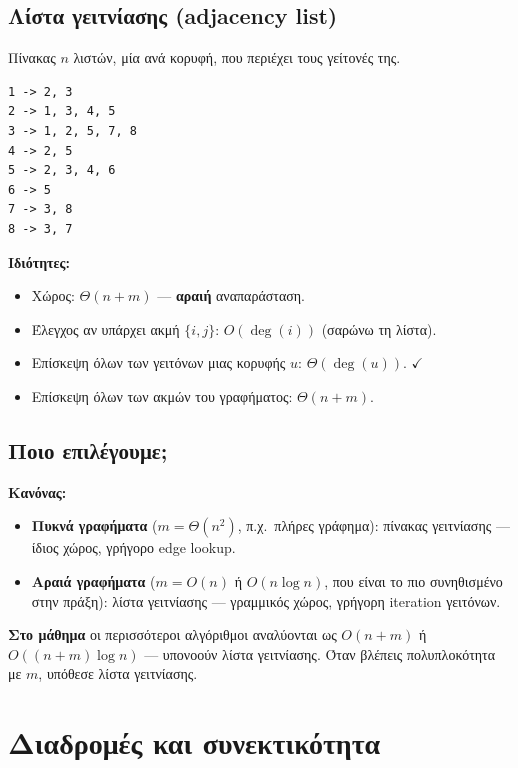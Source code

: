 \documentclass[11pt,a4paper]{article}
\begin{document}
\subsection{Λίστα γειτνίασης (adjacency list)}

Πίνακας $n$ λιστών, μία ανά κορυφή, που περιέχει τους γείτονές της.

\begin{codebox}
\begin{verbatim}
1 -> 2, 3
2 -> 1, 3, 4, 5
3 -> 1, 2, 5, 7, 8
4 -> 2, 5
5 -> 2, 3, 4, 6
6 -> 5
7 -> 3, 8
8 -> 3, 7
\end{verbatim}
\end{codebox}

\textbf{Ιδιότητες:}
\begin{itemize}
  \item Χώρος: $\Theta(n + m)$ --- \textbf{αραιή} αναπαράσταση.
  \item Έλεγχος αν υπάρχει ακμή $\{i, j\}$: $O(\deg(i))$ (σαρώνω τη λίστα).
  \item Επίσκεψη όλων των γειτόνων μιας κορυφής $u$: $\Theta(\deg(u))$.
  $\checkmark$
  \item Επίσκεψη όλων των ακμών του γραφήματος: $\Theta(n + m)$.
\end{itemize}

\subsection{Ποιο επιλέγουμε;}

\begin{keypoint}
\textbf{Κανόνας:}
\begin{itemize}
  \item \textbf{Πυκνά γραφήματα} ($m = \Theta(n^2)$, π.χ.\ πλήρες γράφημα):
  πίνακας γειτνίασης --- ίδιος χώρος, γρήγορο edge lookup.
  \item \textbf{Αραιά γραφήματα} ($m = O(n)$ ή $O(n \log n)$, που είναι το πιο
  συνηθισμένο στην πράξη): λίστα γειτνίασης --- γραμμικός χώρος, γρήγορη
  iteration γειτόνων.
\end{itemize}
\textbf{Στο μάθημα} οι περισσότεροι αλγόριθμοι αναλύονται ως $O(n + m)$ ή
$O((n+m) \log n)$ --- υπονοούν λίστα γειτνίασης. Όταν βλέπεις πολυπλοκότητα με
$m$, υπόθεσε λίστα γειτνίασης.
\end{keypoint}

\section{Διαδρομές και συνεκτικότητα}
\end{document}
